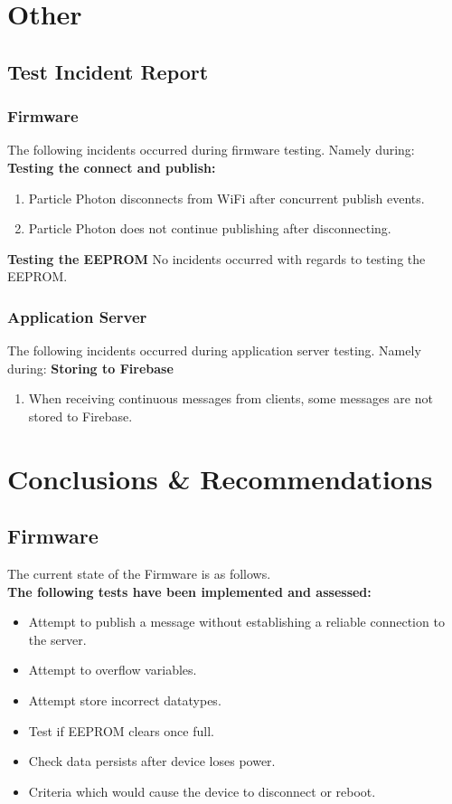 \documentclass[a4paper,10pt]{article}
\begin{document}
	\section{Other}
		\subsection{Test Incident Report}
		\subsubsection{Firmware}
		The following incidents occurred during firmware testing. Namely during:
		\textbf{Testing the connect and publish:}
		\begin{enumerate}
			\item Particle Photon disconnects from WiFi after concurrent publish events.
			\item Particle Photon does not continue publishing after disconnecting.
		\end{enumerate}
		\textbf{Testing the EEPROM}
		No incidents occurred with regards to testing the EEPROM.
		\subsubsection{Application Server}
		The following incidents occurred during application server testing. Namely during:
		\textbf{Storing to Firebase}
		\begin{enumerate}
			\item When receiving continuous messages from clients, some messages are not stored to Firebase.
		\end{enumerate}
	
	\section{Conclusions \& Recommendations}
	\subsection{Firmware}
	The current state of the Firmware is as follows.
	\textbf{\\The following tests have been implemented and assessed:}
	\begin{itemize}
		\item Attempt to publish a message without establishing a reliable connection to the server.
		\item Attempt to overflow variables.
		\item Attempt store incorrect datatypes.
		\item Test if EEPROM clears once full.
		\item Check data persists after device loses power.
		\item Criteria which would cause the device to disconnect or reboot.
	\end{itemize}
	
\end{document}
